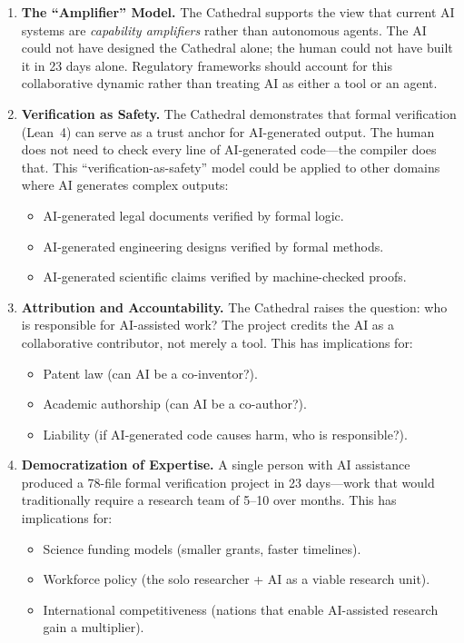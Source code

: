 \documentclass[11pt,a4paper]{article}
\begin{document}
\begin{enumerate}
  \item \textbf{The ``Amplifier'' Model.} The Cathedral supports
    the view that current AI systems are \emph{capability amplifiers}
    rather than autonomous agents. The AI could not have designed the
    Cathedral alone; the human could not have built it in 23 days
    alone. Regulatory frameworks should account for this collaborative
    dynamic rather than treating AI as either a tool or an agent.

  \item \textbf{Verification as Safety.} The Cathedral demonstrates
    that formal verification (Lean~4) can serve as a trust anchor
    for AI-generated output. The human does not need to check every
    line of AI-generated code---the compiler does that. This
    ``verification-as-safety'' model could be applied to other
    domains where AI generates complex outputs:
    \begin{itemize}
      \item AI-generated legal documents verified by formal logic.
      \item AI-generated engineering designs verified by formal
        methods.
      \item AI-generated scientific claims verified by machine-checked
        proofs.
    \end{itemize}

  \item \textbf{Attribution and Accountability.} The Cathedral raises
    the question: who is responsible for AI-assisted work? The
    project credits the AI as a collaborative contributor, not merely
    a tool. This has implications for:
    \begin{itemize}
      \item Patent law (can AI be a co-inventor?).
      \item Academic authorship (can AI be a co-author?).
      \item Liability (if AI-generated code causes harm, who is
        responsible?).
    \end{itemize}

  \item \textbf{Democratization of Expertise.} A single person with
    AI assistance produced a 78-file formal verification project in
    23 days---work that would traditionally require a research team
    of 5--10 over months. This has implications for:
    \begin{itemize}
      \item Science funding models (smaller grants, faster timelines).
      \item Workforce policy (the solo researcher + AI as a viable
        research unit).
      \item International competitiveness (nations that enable
        AI-assisted research gain a multiplier).
    \end{itemize}
\end{enumerate}
\end{document}
